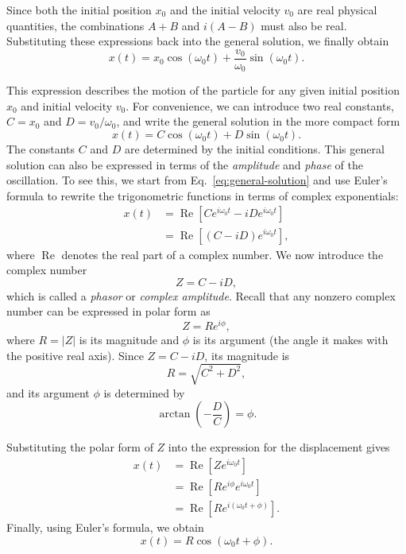 \documentclass[../main.tex]{subfiles}
\begin{document}
Since both the initial position $x_0$ and the initial velocity $v_0$ are real physical quantities, the combinations $A+B$ and $i(A-B)$ must also be real. Substituting these expressions back into the general solution, we finally obtain
\begin{equation}
    x(t)=x_0\cos(\omega_0 t)
    +\frac{v_0}{\omega_0}\sin(\omega_0 t).
\end{equation}

This expression describes the motion of the particle
for any given initial position $x_0$ and initial
velocity $v_0$. For convenience, we can introduce two real constants,
$C=x_0$ and $D=v_0/\omega_0$, and write the general
solution in the more compact form
\begin{equation}
    x(t)=C\cos(\omega_0 t)+D\sin(\omega_0 t).
    \label{eq:general-solution}
\end{equation}
The constants $C$ and $D$ are determined by the
initial conditions. This general solution can also be expressed in terms of the \emph{amplitude} and \emph{phase} of the oscillation. To see this, we start from Eq.~\ref{eq:general-solution} and use Euler's formula to rewrite the trigonometric functions in terms of complex exponentials:
\begin{align}
    x(t)
    &=\operatorname{Re}\left[
    Ce^{i\omega_0 t}-iDe^{i\omega_0 t}
    \right]\nonumber\\
    &=\operatorname{Re}\left[
    (C-iD)e^{i\omega_0 t}
    \right],
\end{align}
where $\operatorname{Re}$ denotes the real part of a complex number. We now introduce the complex number
\begin{equation}
    Z=C-iD,
\end{equation}
which is called a \emph{phasor} or \emph{complex amplitude}. Recall that any nonzero complex number can be expressed in polar form as
\begin{equation}
    Z=Re^{i\phi},
\end{equation}
where $R=|Z|$ is its magnitude and $\phi$ is its argument (the angle it makes with the positive real axis). Since $Z=C-iD$, its magnitude is
\begin{equation}
    \boxed{R=\sqrt{C^2+D^2},}
\end{equation}
and its argument $\phi$ is determined by
\begin{equation}
    \arctan\left(-\frac{D}{C}\right)=\phi.
\end{equation}

Substituting the polar form of $Z$ into the expression for the displacement gives
\begin{align}
    x(t)
    &=\operatorname{Re}\left[Ze^{i\omega_0 t}\right]
    \nonumber\\
    &=\operatorname{Re}\left[Re^{i\phi}e^{i\omega_0 t}\right]
    \nonumber\\
    &=\operatorname{Re}\left[Re^{i(\omega_0 t+\phi)}\right].
\end{align}
Finally, using Euler's formula, we obtain
\begin{equation}
    \boxed{x(t)=R\cos(\omega_0 t+\phi).}
\end{equation}
\end{document}
